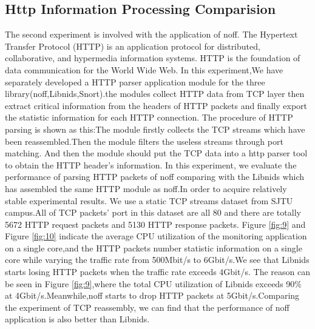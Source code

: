 \documentclass[conference]{IEEEtran}
\begin{document}
\subsection{Http Information Processing Comparision}
The second experiment is involved with the application of noff. The Hypertext Transfer Protocol (HTTP) is an application protocol for distributed, collaborative, and hypermedia information systems. HTTP is the foundation of data communication for the World Wide Web. In this experiment,We have separately developed a HTTP parser application module for the three library(noff,Libnids,Snort).the modules collect HTTP data from TCP layer then extract critical information from the headers of HTTP packets and finally export the statistic information for each HTTP connection.
\newline\indent The procedure of HTTP parsing is shown as this:The module firstly collects the TCP streams which have been reassembled.Then the module filters the useless streams through port matching.
And then the module should put the TCP data into a http parser tool to obtain the HTTP header's information.
\newline\indent In this experiment, we evaluate the performance of parsing HTTP packets of noff comparing with the Libnids which has assembled the same HTTP module as noff.In order to acquire relatively stable experimental results. We use a static TCP streams dataset from SJTU campus.All of TCP packets' port in this dataset are all 80 and there are totally 5672 HTTP request packets and 5130 HTTP response packets. Figure \ref{fig:9} and Figure \ref{fig:10} indicate the average CPU utilization of the monitoring application on a single core,and the HTTP packets number statistic information on a single core while varying the traffic rate from 500Mbit/s to 6Gbit/s.We see that Libnids starts losing 
HTTP packets when the traffic rate exceeds 4Gbit/s. The reason can be seen in Figure \ref{fig:9},where the total CPU utilization of Libnids exceeds 90\% at 4Gbit/s.Meanwhile,noff starts to drop HTTP packets at 5Gbit/s.Comparing the experiment of TCP reassembly, we can find that the performance of noff application is also better than Libnids.
\end{document}
